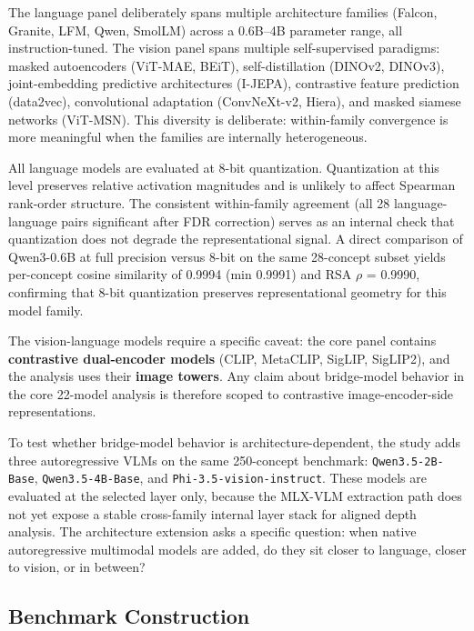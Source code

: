 \documentclass[11pt,a4paper]{article}
\begin{document}
The language panel deliberately spans multiple architecture families
(Falcon, Granite, LFM, Qwen, SmolLM) across a 0.6B--4B parameter range,
all instruction-tuned. The vision panel spans multiple self-supervised
paradigms: masked autoencoders (ViT-MAE, BEiT), self-distillation
(DINOv2, DINOv3), joint-embedding predictive architectures (I-JEPA),
contrastive feature prediction (data2vec), convolutional adaptation
(ConvNeXt-v2, Hiera), and masked siamese networks (ViT-MSN). This
diversity is deliberate: within-family convergence is more meaningful
when the families are internally heterogeneous.

All language models are evaluated at 8-bit quantization. Quantization at
this level preserves relative activation magnitudes and is unlikely to
affect Spearman rank-order structure. The consistent within-family
agreement (all 28 language-language pairs significant after FDR
correction) serves as an internal check that quantization does not
degrade the representational signal. A direct comparison of Qwen3-0.6B
at full precision versus 8-bit on the same 28-concept subset yields
per-concept cosine similarity of 0.9994 (min 0.9991) and RSA \(\rho\) =
0.9990, confirming that 8-bit quantization preserves representational
geometry for this model family.

The vision-language models require a specific caveat: the core panel
contains \textbf{contrastive dual-encoder models} (CLIP, MetaCLIP,
SigLIP, SigLIP2), and the analysis uses their \textbf{image towers}. Any
claim about bridge-model behavior in the core 22-model analysis is
therefore scoped to contrastive image-encoder-side representations.

To test whether bridge-model behavior is architecture-dependent, the
study adds three autoregressive VLMs on the same 250-concept benchmark:
\texttt{Qwen3.5-2B-Base}, \texttt{Qwen3.5-4B-Base}, and
\texttt{Phi-3.5-vision-instruct}. These models are evaluated at the
selected layer only, because the MLX-VLM extraction path does not yet
expose a stable cross-family internal layer stack for aligned depth
analysis. The architecture extension asks a specific question: when
native autoregressive multimodal models are added, do they sit closer to
language, closer to vision, or in between?

\subsection{Benchmark Construction}\label{benchmark-construction}
\end{document}
